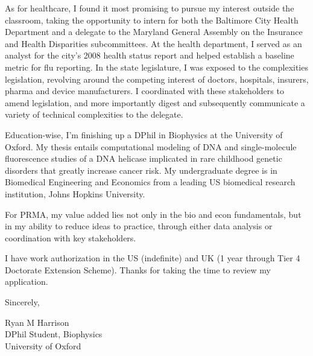 \documentclass{../res}
\begin{document}
\begin{sloppypar}
\begin{resume}
As for healthcare, I found it most promising to pursue my interest outside the classroom, taking the opportunity to intern for both the Baltimore City Health Department and a delegate to the Maryland General Assembly on the Insurance and Health Disparities subcommittees. At the health department, I served as an analyst for the city's 2008 health status report and helped establish a baseline metric for flu reporting. In the state legislature, I was exposed to the complexities legislation, revolving around the competing interest of doctors, hospitals, insurers, pharma and device manufacturers. I coordinated with these stakeholders to amend legislation, and more importantly digest and subsequently communicate a variety of technical complexities to the delegate.

Education-wise, I'm finishing up a DPhil in Biophysics at the University of Oxford. My thesis entails computational modeling of DNA and single-molecule fluorescence studies of a DNA helicase implicated in rare childhood genetic disorders that greatly increase cancer risk. My undergraduate degree is in Biomedical Engineering and Economics from a leading US biomedical research institution, Johns Hopkins University.

For PRMA, my value added lies not only in the bio and econ fundamentals, but in my ability to reduce ideas to practice, through either data analysis or coordination with key stakeholders.

I have work authorization in the US (indefinite) and UK (1 year through Tier 4 Doctorate Extension Scheme). Thanks for taking the time to review my application.

\vspace{1\baselineskip}
Sincerely,
\vspace{2\baselineskip}

Ryan M Harrison \\
DPhil Student, Biophysics\\
University of Oxford \\


\end{resume} 
\end{sloppypar}
\end{document}

